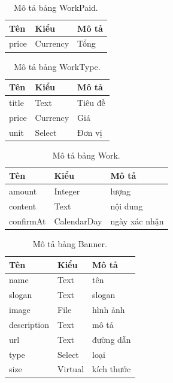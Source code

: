 \documentclass[11pt]{report}
\begin{document}
	
	\begin{table}[h!]
		\begin{center}
			\caption{Mô tả bảng WorkPaid.}
			\begin{tabular}{ |l|l|l| } 
				\hline
				Tên & Kiểu & Mô tả \\
				\hline
				price & Currency & Tổng \\ 
				\hline
			\end{tabular}
			\label{table:WorkPaid}
		\end{center}
	\end{table}
	
	
	\begin{table}[h!]
		\begin{center}
			\caption{Mô tả bảng WorkType.}
			\begin{tabular}{ |l|l|l| } 
				\hline
				Tên & Kiểu & Mô tả \\
				\hline
				title & Text & Tiêu đề \\
				price & Currency & Giá \\
				unit & Select & Đơn vị \\ 
				\hline
			\end{tabular}
			\label{table:WorkType}
		\end{center}
	\end{table}
	
	
	\begin{table}[h!]
		\begin{center}
			\caption{Mô tả bảng Work.}
			\begin{tabular}{ |l|l|l| } 
				\hline
				Tên & Kiểu & Mô tả \\
				\hline
				amount & Integer & lượng \\
				content & Text & nội dung \\
				confirmAt & CalendarDay & ngày xác nhận \\ 
				\hline
			\end{tabular}
			\label{table:Work}
		\end{center}
	\end{table}
	
	
	\begin{table}[h!]
		\begin{center}
			\caption{Mô tả bảng Banner.}
			\begin{tabular}{ |l|l|l| } 
				\hline
				Tên & Kiểu & Mô tả \\
				\hline
				name & Text & tên \\
				slogan & Text & slogan \\
				image & File & hình ảnh \\
				description & Text & mô tả \\
				url & Text & đường dẫn \\
				type & Select & loại \\
				size & Virtual & kích thước \\ 
				\hline
			\end{tabular}
			\label{table:Banner}
		\end{center}
	\end{table}
	
\end{document}
